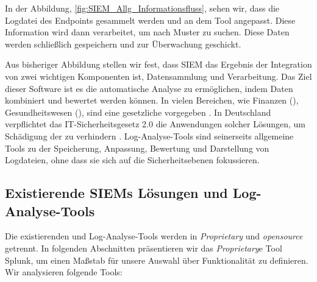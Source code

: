 In der Abbildung, \ref{fig:SIEM_Allg_Informationsfluss}, sehen wir, dass die Logdatei des \gls{Endpoint}s gesammelt werden und an dem Tool angepasst. Diese Information wird dann verarbeitet, um nach Muster zu suchen. Diese Daten werden schließlich gespeichern und zur Überwachung geschickt.





Aus bisheriger Abbildung stellen wir fest, dass \gls{SIEM} das Ergebnis der Integration von zwei wichtigen Komponenten ist, Datensammlung und Verarbeitung. Das Ziel dieser Software ist es die automatische Analyse zu ermöglichen, indem Daten kombiniert und bewertet werden können. In vielen Bereichen, wie Finanzen (), Gesundheitswesen (), sind  eine gesetzliche vorgegeben \citep{Jog_SIEM}. In Deutschland verpflichtet das \gls{IT-Sicherheitsgesetz 2.0} die Anwendungen solcher Lösungen, um Schädigung der  zu verhindern \citep{BSI_ITSG}. Log-Analyse-Tools sind seinerseits allgemeine Tools zu der Speicherung, Anpassung, Bewertung und Darstellung von Logdateien, ohne dass sie sich auf die Sicherheitsebenen fokussieren.

\subsection{Existierende SIEMs Lösungen und Log-Analyse-Tools}
Die existierenden  und Log-Analyse-Tools werden in \textit{\gls{Proprietary}} und \textit{\gls{opensource}} getrennt. In folgenden Abschnitten präsentieren wir das \textit{\gls{Proprietary}}e Tool Splunk, um einen Maßstab für unsere Auswahl über Funktionalität zu definieren. Wir analysieren folgende Tools: %

